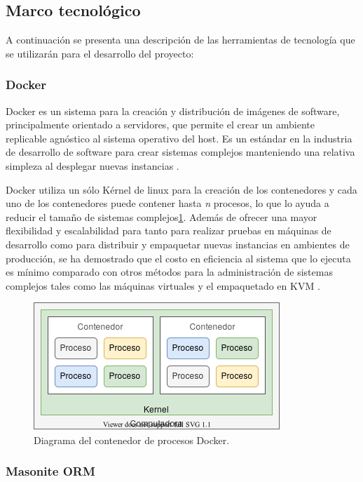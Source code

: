 \subsection{Marco tecnológico}

A continuación se presenta una descripción de las herramientas de tecnología que se utilizarán para el desarrollo del proyecto:

\subsubsection{Docker}

Docker es un sistema para la creación y distribución de imágenes de software, principalmente orientado a servidores, que permite el crear un ambiente replicable agnóstico al sistema operativo del host. Es un estándar en la industria de desarrollo de software para crear sistemas complejos manteniendo una relativa simpleza al desplegar nuevas instancias \cite{rad2017dockerAnalysis}.

Docker utiliza un sólo Kérnel de linux para la creación de los contenedores y cada uno de los contenedores puede contener hasta \textit{n} procesos, lo que lo ayuda a reducir el tamaño de sistemas complejos\ref{fig:docker_diagrama}. Además de ofrecer una mayor flexibilidad y escalabilidad para tanto para realizar pruebas en máquinas de desarrollo como para distribuir y empaquetar nuevas instancias en ambientes de producción, se ha demostrado que el costo en eficiencia al sistema que lo ejecuta es mínimo comparado con otros métodos para la administración de sistemas complejos tales como las máquinas virtuales y el empaquetado en KVM \cite{rad2017dockerAnalysis, felter2015comparsionPerformance}.


\begin{figure}[!ht]
	\centering
	\includegraphics[width=.45\linewidth]{images/diagrams/docker.png}
	\caption{Diagrama del contenedor de procesos Docker.}
	\label{fig:docker_diagrama}
\end{figure}

\subsubsection{Masonite ORM}

